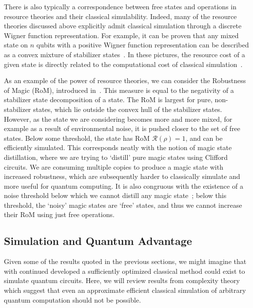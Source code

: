 There is also typically a correspondence between free states and operations in resource theories and their classical simulability. Indeed, many of the resource theories discussed above explicitly admit classical simulation through a discrete Wigner function representation. For example, it can be proven that any mixed state on $n$ qubits with a positive Wigner function representation can be described as a convex mixture of stabilizer states~\cite{Gross2006}. In these pictures, the resource cost of a given state is directly related to the computational cost of classical simulation~\cite{Howard2017,Kocia2017,Seddon2019,Raussendorf2019}.\par
As an example of the power of resource theories, we can consider the Robustness of Magic (RoM), introduced in~\cite{Howard2017}. This measure is equal to the negativity of a stabilizer state decomposition of a state. The RoM is largest for pure, non-stabilizer states, which lie outside the convex hull of the stabilizer states. However, as the state we are considering becomes more and more mixed, for example as a result of environmental noise, it is pushed closer to the set of free states. Below some threshold, the state has RoM $\mathcal{R}\left(\rho\right)=1$, and can be efficiently simulated. This corresponds neatly with the notion of magic state distillation, where we are trying to `distill' pure magic states using Clifford circuits. We are consuming multiple copies to produce a magic state with increased robustness, which are subsequently harder to classically simulate and more useful for quantum computing. It is also congruous with the existence of a noise threshold below which we cannot distill any magic state~\cite{Bravyi2005}; below this threshold, the `noisy' magic states are `free' states, and thus we cannot increase their RoM using just free operations.
\subsection{Simulation and Quantum Advantage}\label{sec:intro_complexity}
Given some of the results quoted in the previous sections, we might imagine that with continued developed a sufficiently optimized classical method could exist to simulate quantum circuits. Here, we will review results from complexity theory which suggest that even an approximate efficient classical simulation of arbitrary quantum computation should not be possible.\par
